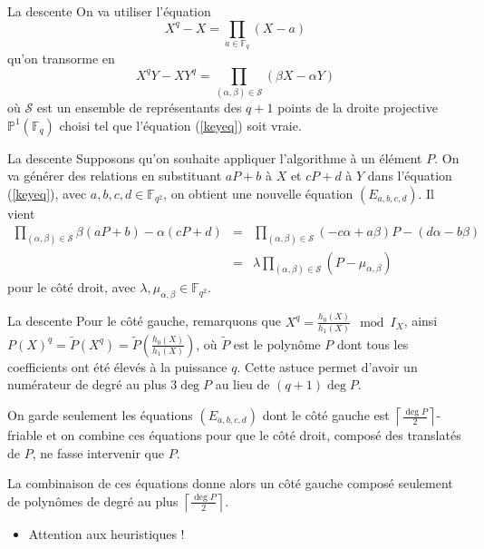 \documentclass[xcolor=x11names,compress]{beamer}
\theoremstyle{break}
\theoremstyle{sc}
\theoremstyle{definition}
\theoremstyle{remark}
\begin{document}
\begin{frame}{La descente}
 On va utiliser l'équation 
 \[
   X^q - X = \prod_{a\in\mathbb{F}_q}(X-a)
 \]
 qu'on transorme en
 \begin{equation}
   X^qY - XY^q = \prod_{(\alpha, \beta)\in\mathcal S}(\beta X - \alpha Y)
   \label{keyeq}
 \end{equation}
 où $\mathcal S$ est un ensemble de représentants des $q+1$ points de la droite
 projective $\mathbb{P}^1(\mathbb{F}_q)$ choisi tel que l'équation
 (\ref{keyeq}) soit vraie.
\end{frame}

\begin{frame}{La descente}
  Supposons qu'on souhaite appliquer l'algorithme à un élément $P$. On va
  générer des relations en substituant $aP + b$ à $X$ et $cP + d$ à $Y$ dans l'équation
  (\ref{keyeq}), avec $a, b, c, d \in \mathbb{F}_{q^2}$, on obtient une nouvelle
  équation $(E_{a, b, c, d})$. Il vient 
  \begin{eqnarray*}
 \prod_{(\alpha, \beta)\in\mathcal S}\beta (aP + b) - \alpha (cP + d) &=&
 \prod_{(\alpha, \beta)\in\mathcal S}(-c\alpha + a\beta)P - (d\alpha - b\beta) \\
 &=& \lambda \prod_{(\alpha, \beta)\in\mathcal S}(P-\mu_{\alpha, \beta})
  \end{eqnarray*}
  pour le côté droit, avec $\lambda, \mu_{\alpha, \beta}\in\mathbb{F}_{q^2}$.
  
\end{frame}

\begin{frame}{La descente}
  Pour le côté gauche, remarquons que $X^q = \frac{h_0(X)}{h_1(X)} \mod I_X$,
  ainsi $P(X)^q = \tilde P(X^q) = \tilde P(\frac{h_0(X)}{h_1(X)})$, où $\tilde
  P$ est le
  polynôme $P$ dont tous les coefficients ont été élevés à la puissance $q$.
  Cette astuce permet d'avoir un numérateur de degré au plus $3\deg P$ au lieu
  de $(q+1)\deg P$.

  On garde seulement les équations $(E_{a, b, c, d})$ dont le côté gauche est
  $\left\lceil \frac{\deg P}{2}\right\rceil$-friable et on combine ces équations
  pour que le côté droit, composé des translatés de $P$, ne fasse intervenir que
  $P$.

  La combinaison de ces équations donne alors un côté gauche composé seulement
  de polynômes de degré au plus $\left\lceil \frac{\deg P}{2}\right\rceil$.
  \begin{itemize}
    \item Attention aux heuristiques !
  \end{itemize}
\end{frame}
\end{document}
